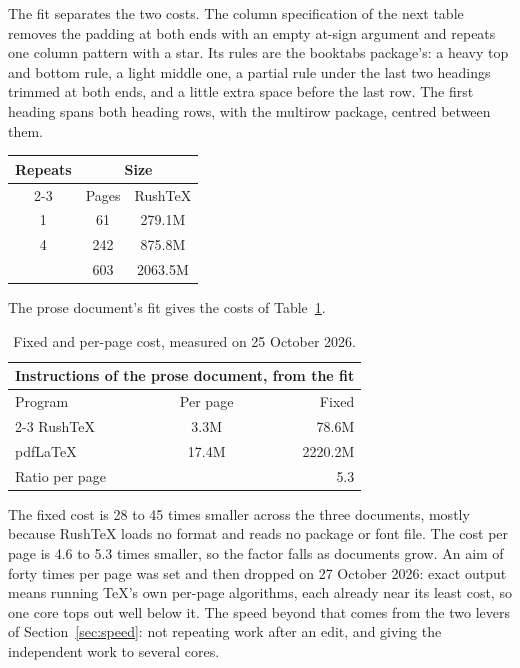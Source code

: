 \documentclass{article}
\numberwithin{equation}{section}
\theoremstyle{definition}
\theoremstyle{remark}
\begin{document}
The fit separates the two costs. The column specification of the next table removes the
padding at both ends with an empty at-sign argument and repeats one column pattern with
a star. Its rules are the booktabs package's: a heavy top and bottom rule, a light middle
one, a partial rule under the last two headings trimmed at both ends, and a little extra
space before the last row. The first heading spans both heading rows, with the multirow
package, centred between them.

\begin{center}
\begin{tabular}{@{}*{3}{c}@{}}
\toprule
\multirow{2}{*}{Repeats} & \multicolumn{2}{c}{Size} \\
\cmidrule(lr){2-3}
 & Pages & RushTeX \\
\midrule
1 & 61 & 279.1M \\
4 & 242 & 875.8M \\
\addlinespace
10 & 603 & 2063.5M \\
\bottomrule
\end{tabular}
\end{center}

The prose document's fit gives the costs of Table~\ref{tab:fit}.

\begin{table}[h]
\centering
\begin{tabular}{|l|c|r|}
\hline
\multicolumn{3}{|c|}{\bfseries Instructions of the prose document, from the fit} \\
\hline\hline
Program & Per page & Fixed \\
\cline{2-3}
RushTeX  & 3.3M & 78.6M \\
pdfLaTeX & 17.4M & 2220.2M \\
\multicolumn{2}{|l|}{Ratio per page} & 5.3 \\
\hline
\end{tabular}
\caption{Fixed and per-page cost, measured on 25 October 2026.}\label{tab:fit}
\end{table}

The fixed cost is 28 to 45 times smaller across the three documents, mostly because
RushTeX loads no format and reads no package or font file. The cost per page is 4.6 to
5.3 times smaller, so the factor falls as documents grow. An aim of forty times per page
was set and then dropped on 27 October 2026: exact output means running \TeX's own
per-page algorithms, each already near its least cost, so one core tops out well below
it. The speed beyond that comes from the two levers of Section~\ref{sec:speed}: not
repeating work after an edit, and giving the independent work to several cores.
\end{document}
